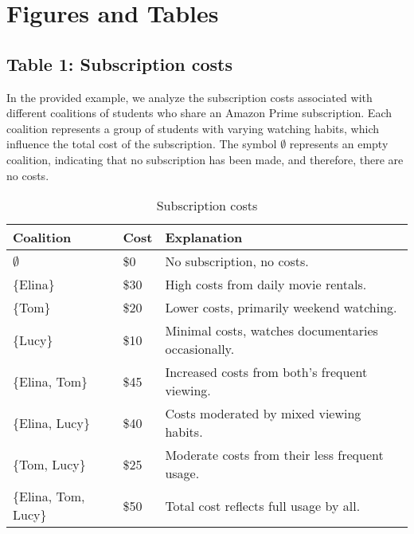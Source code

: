 \documentclass[12pt]{article}
\begin{document}
\newpage
\section{Figures and Tables}

\subsection{Table 1: Subscription costs}
In the provided example, we analyze the subscription costs associated with different coalitions of students who share an Amazon Prime subscription. Each coalition represents a group of students with varying watching habits, which influence the total cost of the subscription. The symbol $\emptyset$ represents an empty coalition, indicating that no subscription has been made, and therefore, there are no costs.
\begin{table}[H]
	\centering
	\caption{Subscription costs}
	\begin{tabular}{lll}
		\toprule
		Coalition & Cost & Explanation \\
		\midrule
		$\emptyset$ & \$0 & No subscription, no costs. \\
		\{Elina\} & \$30 & High costs from daily movie rentals. \\
		\{Tom\} & \$20 & Lower costs, primarily weekend watching. \\
		\{Lucy\} & \$10 & Minimal costs, watches documentaries occasionally. \\
		\{Elina, Tom\} & \$45 & Increased costs from both's frequent viewing. \\
		\{Elina, Lucy\} & \$40 & Costs moderated by mixed viewing habits. \\
		\{Tom, Lucy\} & \$25 & Moderate costs from their less frequent usage. \\
		\{Elina, Tom, Lucy\} & \$50 & Total cost reflects full usage by all. \\
		\bottomrule
	\end{tabular}%
	\label{tab:subscription_costs}%
\end{table}%

\newpage
\end{document}
